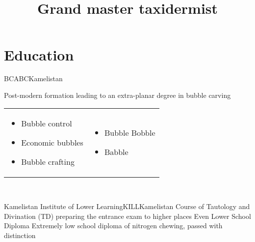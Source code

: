 ﻿\documentclass{fullercv}
\title{Grand master taxidermist}
\begin{document}
\makecvtitle

\section{Education}
    {BCABC}{}{Kamelistan}
    {Post-modern formation leading to an extra-planar degree in bubble carving
    \\
    \begin{tabular}{p{}p{}}
    \begin{itemize}
        \item Bubble control
        \item Economic bubbles
        \item Bubble crafting
    \end{itemize} &
    \begin{itemize}
        \item Bubble Bobble
        \item Babble
    \end{itemize}
    \end{tabular} \\[-1em]
}
    {Kamelistan Institute of Lower Learning}{KILL}{}{Kamelistan}
    {Course of Tautology and Divination (TD) preparing the entrance exam to
    higher places}
    {Even Lower School Diploma}{}{}{}
    {Extremely low school diploma of nitrogen chewing, passed with distinction}
\end{document}
